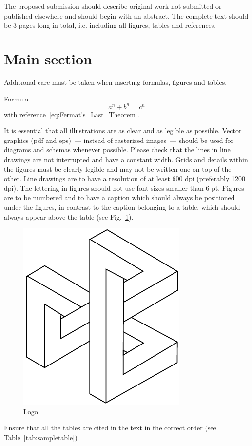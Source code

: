 \documentclass[60x84/16,8pt]{ittmm}
\begin{document}
{The proposed submission should describe original work not submitted or
published elsewhere and should begin with an abstract. The complete
text should be 3 pages long in
total, i.e. including all figures, tables and references. 


\section{Main section} 
\label{sec:base-section}

Additional care must be taken when inserting formulas, figures and tables.

Formula
\begin{equation}
a^n+b^n=c^n
\label{eq:Fermat's_Last_Theorem}
\end{equation}
with reference~\eqref{eq:Fermat's_Last_Theorem}.

It is essential that all illustrations are as clear and as legible as
possible. Vector graphics (pdf and eps)~--- instead of rasterized
images~--- should be used for diagrams and schemas whenever
possible. Please check that the lines in line drawings are not
interrupted and have a constant width. Grids and details within the
figures must be clearly legible and may not be written one on top of
the other. Line drawings are to have a resolution of at least 600 dpi
(preferably 1200 dpi). The lettering in figures should not use font
sizes smaller than 6 pt. Figures are to be
numbered and to have a caption which should always be positioned under
the figures, in contrast to the caption belonging to a table, which
should always appear above the table (see Fig.~\ref{fig:logo}).

\begin{figure}
  \centering
  \includegraphics[width=0.4\linewidth]{embl}
  \caption{Logo}
  \label{fig:logo}
\end{figure}

Ensure that all the tables are cited in the text in the correct
order (see Table~\ref{tab:sampletable}). 

}
\end{document}
